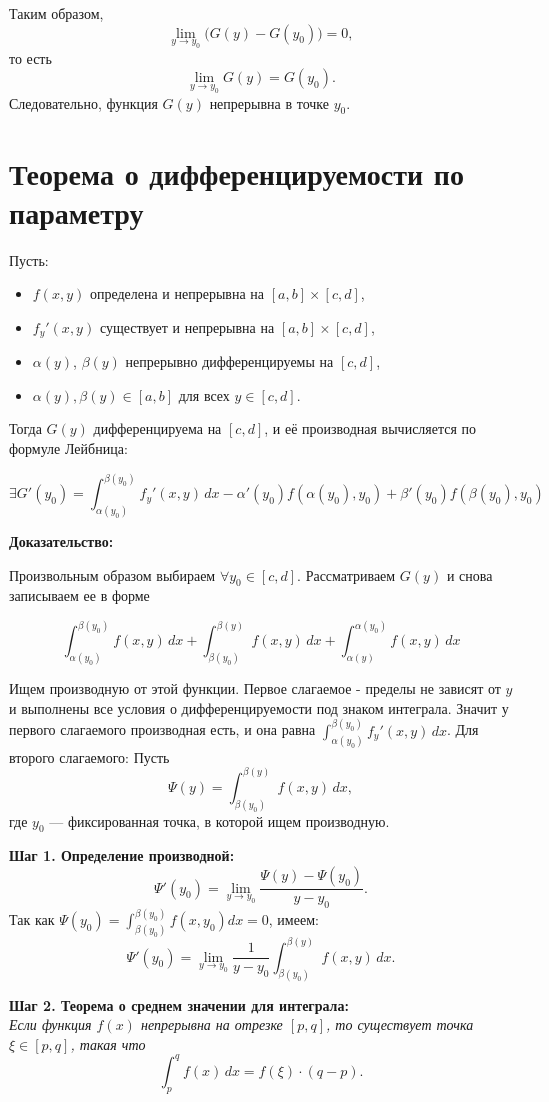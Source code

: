 \documentclass{article}
\begin{document}
Таким образом,
\[
\lim_{y\to y_0} \bigl(G(y)-G(y_0)\bigr)=0,
\]
то есть
\[
\lim_{y\to y_0} G(y)=G(y_0).
\]
Следовательно, функция $G(y)$ непрерывна в точке $y_0$.

\section*{Теорема о дифференцируемости по параметру}

Пусть:
\begin{itemize}
    \item $ f(x, y) $ определена и непрерывна на $ [a, b] \times [c, d] $,
    \item $ f_y'(x, y) $ существует и непрерывна на $ [a, b] \times [c, d] $,
    \item $ \alpha(y) $, $ \beta(y) $ непрерывно дифференцируемы на $ [c, d] $,
    \item $ \alpha(y), \beta(y) \in [a, b] $ для всех $ y \in [c, d] $.
\end{itemize}

Тогда $ G(y) $ дифференцируема на $ [c, d] $, и её производная вычисляется по формуле Лейбница:

\[
\exists G'(y_0) = \int_{\alpha(y_0)}^{\beta(y_0)} f_y'(x, y) \, dx - \alpha'(y_0) f(\alpha(y_0), y_0) + \beta'(y_0) f(\beta(y_0), y_0)
\]

\textbf{Доказательство:}

Произвольным образом выбираем $\forall y_0 \in [c, d]$. Рассматриваем $G(y)$ и снова записываем ее в форме

\[
\int_{\alpha(y_0)}^{\beta(y_0)} f(x, y) \, dx + \int_{\beta(y_0)}^{\beta(y)} f(x, y) \, dx + \int_{\alpha(y)}^{\alpha(y_0)} f(x, y) \, dx
\]

Ищем производную от этой функции. Первое слагаемое - пределы не зависят от $y$ и выполнены все условия о дифференцируемости под знаком интеграла. Значит у первого слагаемого производная есть, и она равна $\int_{\alpha(y_0)}^{\beta(y_0)} f_y'(x, y) \, dx$. Для второго слагаемого:
Пусть
\[
\Psi(y) = \int_{\beta(y_0)}^{\beta(y)} f(x, y) \, dx,
\]
где \(y_0\) — фиксированная точка, в которой ищем производную.

\textbf{Шаг 1. Определение производной:}
\[
\Psi'(y_0) = \lim_{y \to y_0} \frac{\Psi(y) - \Psi(y_0)}{y - y_0}.
\]
Так как \(\Psi(y_0) = \int_{\beta(y_0)}^{\beta(y_0)} f(x, y_0) dx = 0\), имеем:
\[
\Psi'(y_0) = \lim_{y \to y_0} \frac{1}{y - y_0} \int_{\beta(y_0)}^{\beta(y)} f(x, y) \, dx.
\]

\textbf{Шаг 2. Теорема о среднем значении для интеграла:} \\
\textit{Если функция \(f(x)\) непрерывна на отрезке \([p, q]\), то существует точка \(\xi \in [p, q]\), такая что}
\[
\int_p^q f(x) \, dx = f(\xi) \cdot (q - p).
\]
\end{document}
